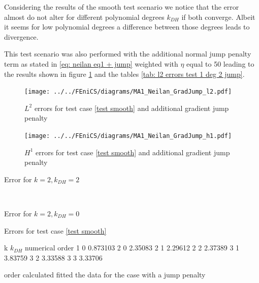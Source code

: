 Considering the results of the smooth test scenario we notice that the error almost do not alter for different polynomial degrees $k_{DH}$ if both converge. Albeit it seems for low polynomial degrees a difference between those degrees leads to divergence.

This test scenario was also performed with the additional normal jump penalty term as stated in \eqref{eq: neilan eq1 + jump} weighted with $\eta$ equal to 50 leading to the results shown in figure \ref{fig: l2 errors test 1 jump} and the tables \ref{tab: l2 errors test 1 deg 2 jump}.

\begin{figure}[h!]
\centering
	\texttt{[image: ../../FEniCS/diagrams/MA1\_Neilan\_GradJump\_l2.pdf]}
	\caption{$L^2$ errors for test case \ref{test smooth} and additional gradient jump penalty}
	\label{fig: l2 errors test 1 jump}
\end{figure}

\begin{figure}[h!]
\centering
	\texttt{[image: ../../FEniCS/diagrams/MA1\_Neilan\_GradJump\_h1.pdf]}
	\caption{$H^1$ errors for test case \ref{test smooth} and additional gradient jump penalty}
	\label{fig: h1 errors test 1 jump}
\end{figure}

\begin{table}[h]
	\begin{subtable}[b]{0.45\textwidth}
		\centering
		\pgfplotstabletypeset[
		columns={iterations, l2error, h1error,N},
		    every row 0 column 0/.style={set content=init},
		]\MAOneJumpdegTwoTwo
    	\caption{Error for $k=2, k_{DH}=2$}
   \end{subtable}
   ~
	\begin{subtable}[b]{0.45\textwidth}
		\centering
		\pgfplotstabletypeset[columns={iterations, l2error, h1error,N},
		    every row 0 column 0/.style={set content=init},
		]\MAOneJumpdegTwoZero
	\caption{Error for $k=2, k_{DH}=0$}
	\end{subtable}
	\caption{Errors for test case \ref{test smooth}}
	\label{tab: l2 errors test 1 deg 2 jump}
\end{table}


\begin{table}
	\pgfplotstabletypeset
	{
		k $k_{DH}$ {numerical order}
		1 0 0.873103
		2 0 2.35083
		2 1 2.29612
		2 2 2.37389
		3 1 3.83759
		3 2 3.33588
		3 3 3.33706
	}
\caption{order calculated fitted the data for the case with a jump penalty}
\label{tab: order jump}
\end{table}


